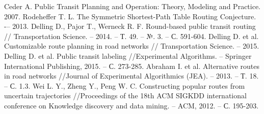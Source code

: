 \begin{thebibliography}{10}
     Ceder A. Public Transit Planning and Operation: Theory, Modeling and Practice. 2007.
     Rodeheffer T. L. The Symmetric Shortest-Path Table Routing 
        Conjecture. -– 2013.
     Delling D., Pajor T., Werneck R. F. Round-based public transit routing //
        Transportation Science. -- 2014. -- Т. 49. -- №. 3. -- С. 591-604.
     Delling D. et al. Customizable route planning in road networks //
        Transportation Science. -- 2015.
     Delling D. et al. Public transit labeling //Experimental Algorithms. -- 
        Springer International Publishing, 2015. -- С. 273-285.
     Abraham I. et al. Alternative routes in road networks //Journal of 
        Experimental Algorithmics (JEA). -- 2013. -- Т. 18. -- С. 1.3.
     Wei L. Y., Zheng Y., Peng W. C. Constructing popular routes from 
        uncertain trajectories //Proceedings of the 18th ACM SIGKDD international conference on 
        Knowledge discovery and data mining. -- ACM, 2012. -- С. 195-203.


\end{thebibliography}
